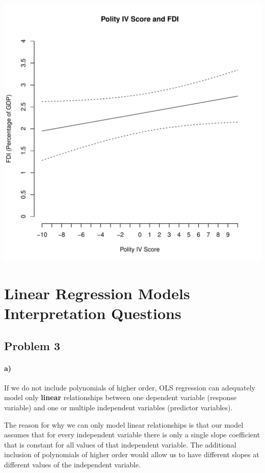 \documentclass[12pt]{article}\usepackage[]{graphicx}\usepackage[]{color}
\makeatletter
\def\maxwidth{ %
  \ifdim\Gin@nat@width>\linewidth
    \linewidth
  \else
    \Gin@nat@width
  \fi
}
\newenvironment{knitrout}{}{} %
\makeatother
\begin{document}
\begin{knitrout}
\includegraphics[width=\maxwidth]{figure/unnamed-chunk-3-1} 

\end{knitrout}



\section*{Linear Regression Models Interpretation Questions}

\subsection*{Problem 3}

\paragraph*{a)} If we do not include polynomials of higher order, OLS regression can adequately model only \textbf{linear} relationships between one dependent variable (response variable) and one or multiple independent variables (predictor variables).

The reason for why we can only model linear relationships is that our model assumes that for every independent variable there is only a single slope coefficient that is constant for all values of that independent variable. The additional inclusion of polynomials of higher order would allow us to have different slopes at different values of the independent variable.
\end{document}
